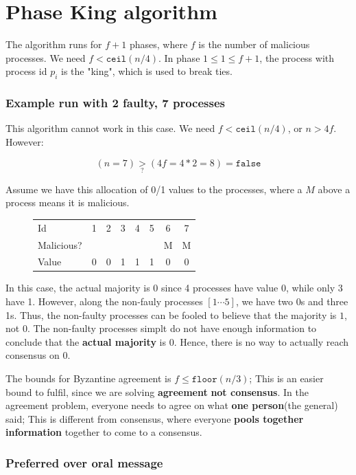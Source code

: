 \documentclass{article}
\begin{document}
\section{Phase King algorithm}

The algorithm runs for $f+1$ phases, where $f$ is the number of malicious processes.
We need $f < \texttt{ceil}(n/4)$. In phase $1 \leq 1 \leq f + 1$, the process
with process id $p_i$ is the "king", which is used to break ties. 

\subsubsection{Example run with 2 faulty, 7 processes}

This algorithm cannot work in this case. We need $f < \texttt{ceil}(n/4)$, or $n > 4 f$.
However:

$$(n=7) \underset{?}{>} (4f = 4*2 = 8) = \texttt{false}$$

Assume we have this allocation of 0/1 values to
the processes, where a $M$ above a process means it is malicious.

\begin{figure}[h]
\centering
\begin{tabular}{lccccccc}
  Id         &1 & 2 & 3 & 4 & 5 & 6 & 7 \\
  Malicious? &  &   &   &   &   & M & M \\
  Value      &0 & 0 & 1 & 1 & 1 & 0 & 0 \\
\end{tabular}
\end{figure}

In this case, the actual majority is $0$ since 4 processes have value $0$,
while only $3$ have 1. However, along the non-fauly processes $[1\cdots 5]$,
we have two 0s and three 1s. Thus, the non-faulty processes can be fooled
to believe that the majority is $1$, not $0$. The non-faulty processes simplt
do not have enough information to conclude that the \textbf{actual majority} is $0$.
Hence, there is no way to actually reach consensus on $0$.

The bounds for Byzantine agreement is $f \leq \texttt{floor}(n/3)$; This is
an easier bound to fulfil, since we are
solving \textbf{agreement} \textbf{not consensus}. In the agreement problem,
everyone needs to agree on what \textbf{one person}(the general) said;
This is different from consensus, where everyone \textbf{pools together information}
together to come to a consensus.

\subsubsection{Preferred over oral message}
\end{document}
